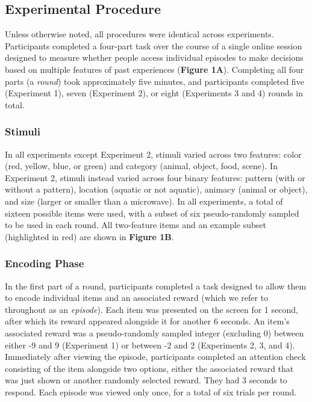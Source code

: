 \documentclass[10pt,letterpaper]{article}
\begin{document}
\subsection{Experimental Procedure}

Unless otherwise noted, all procedures were identical across experiments. Participants completed a four-part task over the course of a single online session designed to measure whether people access individual episodes to make decisions based on multiple features of past experiences (\textbf{Figure 1A}). Completing all four parts (a \textit{round}) took approximately five minutes, and participants completed five (Experiment 1), seven (Experiment 2), or eight (Experiments 3 and 4) rounds in total.

\subsubsection{Stimuli}

In all experiments except Experiment 2, stimuli varied across two features: color (red, yellow, blue, or green) and category (animal, object, food, scene). In Experiment 2, stimuli instead varied across four binary features: pattern (with or without a pattern), location (aquatic or not aquatic), animacy (animal or object), and size (larger or smaller than a microwave). In all experiments, a total of sixteen possible items were used, with a subset of six pseudo-randomly sampled to be used in each round. All two-feature items and an example subset (highlighted in red) are shown in \textbf{Figure 1B}. 

\subsubsection{Encoding Phase}

In the first part of a round, participants completed a task designed to allow them to encode individual items and an associated reward (which we refer to throughout as an \textit{episode}). Each item was presented on the screen for 1 second, after which its reward appeared alongside it for another 6 seconds. An item's associated reward was a pseudo-randomly sampled integer (excluding 0) between either -9 and 9 (Experiment 1) or between -2 and 2 (Experiments 2, 3, and 4). Immediately after viewing the episode, participants completed an attention check consisting of the item alongside two options, either the associated reward that was just shown or another randomly selected reward. They had 3 seconds to respond. Each episode was viewed only once, for a total of six trials per round.
\end{document}
